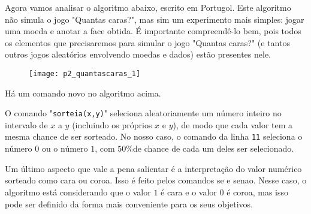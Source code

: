 \label{comp-arr8}

Agora vamos analisar o algoritmo abaixo, escrito em Portugol. Este algoritmo não simula o jogo "Quantas caras?", mas sim um experimento mais simples: jogar uma moeda e anotar a face obtida. É importante compreendê-lo bem, pois todos os elementos que precisaremos para simular o jogo "Quantas caras?"{} (e tantos outros jogos aleatórios envolvendo moedas e dados) estão presentes nele.

\begin{figure}[H]
\centering

\texttt{[image: p2\_quantascaras\_1]}
\end{figure}

Há um comando novo no algoritmo acima.

O comando "\verb|sorteia(x,y)|"{} seleciona aleatoriamente um número inteiro no intervalo de $x$ a $y$ (incluindo os próprios $x$ e $y$), de modo que cada valor tem a mesma chance de ser sorteado. No nosso caso, o comando da linha \verb|11| seleciona o número $0$ ou o número $1$, com $50\% $de chance de cada um deles ser selecionado.

Um último aspecto que vale a pena salientar é a interpretação do valor numérico sorteado como cara ou coroa. Isso é feito pelos comandos se e senao. Nesse caso, o algoritmo está considerando que o valor $1$ é cara e o valor 0 é coroa, mas isso pode ser definido da forma mais conveniente para os seus objetivos.


